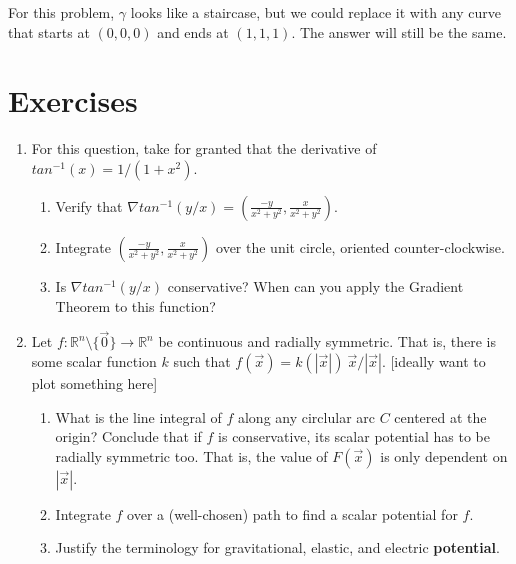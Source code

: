 \documentclass[11pt,openany]{book}
\newcommand*{\exercises}{\section*{\exercisename}}
\newcommand{\exercisename}{Exercises}
\begin{document}
	For this problem, $\gamma$ looks like a staircase, but we could replace it with any curve that starts at $(0,0,0)$ and ends at $(1,1,1)$. The answer will still be the same.
	\exercises
	\begin{enumerate}
		
		\item For this question, take for granted that the derivative of $tan^{-1}(x) = 1/(1+x^2)$. \begin{enumerate}
			\item Verify that $\nabla tan^{-1}(y/x) = (\frac{-y}{x^2+y^2}, \frac{x}{x^2+y^2})$.
			\item Integrate $(\frac{-y}{x^2+y^2}, \frac{x}{x^2+y^2})$ over the unit circle, oriented counter-clockwise.
			\item Is $\nabla tan^{-1}(y/x)$ conservative? When can you apply the Gradient Theorem to this function?
		\end{enumerate}
		\item Let $f:\mathbb{R}^n\setminus\{\vec{0}\} \to\mathbb{R}^n$ be continuous and radially symmetric. That is, there is some scalar function $k$ such that $f(\vec{x})= k(|\vec{x}|) \ \vec{x}/ |\vec{x}|$. [ideally want to plot something here] \begin{enumerate}
			\item What is the line integral of $f$ along any circlular arc $C$ centered at the origin? Conclude that if $f$ is conservative, its scalar potential has to be radially symmetric too. 
			That is, the value of $F(\vec{x})$ is only dependent on $|\vec{x}|$.
			\item Integrate $f$ over a (well-chosen) path to find a scalar potential for $f$.
			\item Justify the terminology for gravitational, elastic, and electric \textbf{potential}.  
		\end{enumerate}
	\end{enumerate}
	
\end{document}
